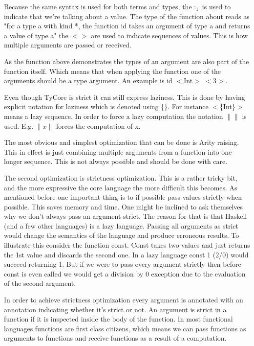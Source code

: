 \documentclass[11pt,twoside,a4paper]{article}
\begin{document}
Because the same syntax is used for both terms and types, the $:_1$ is used to indicate that we're talking about a value. The type of the function about reads as "for a type a with kind *, the function id takes an argument of type a and returns a value of type a" the $<$$>$ are used to indicate sequences of values. This is how multiple arguments are passed or received.

As the function above demonstrates the types of an argument are also part of the function itself. Which means that when applying the function one of the arguments should be a type argument. An example is id $<$Int$>$ $<$3$>$.

Even though TyCore is strict it can still express laziness. This is done by having explicit notation for laziness which is denoted using \{\}. For instance $<$\{Int\}$>$ means a lazy sequence. In order to force a lazy computation the notation $\|\|$ is used. E.g. $\|x\|$ forces the computation of x.

The most obvious and simplest optimization that can be done is Arity raising. This in effect is just combining multiple arguments from a function into one longer sequence. This is not always possible and should be done with care.

The second optimization is strictness optimization. This is a rather tricky bit, and the more expressive the core language the more difficult this becomes. As mentioned before one important thing is to if possible pass values strictly when possible. This saves memory and time. One might be inclined to ask themselves why we don't always pass an argument strict. The reason for that is that Haskell (and a few other languages) is a lazy language. Passing all arguments as strict would change the semantics of the language and produce erroneous results. To illustrate this consider the function const. Const takes two values and just returns the 1st value and discards the second one. In a lazy language const 1 (2/0) would succeed returning 1. But if we were to pass every argument strictly then before const is even called we would get a division by 0 exception due to the evaluation of the second argument.

In order to achieve strictness optimization every argument is annotated with an annotation indicating whether it's strict or not. An argument is strict in a function if it is inspected inside the body of the function.  In most functional languages functions are first class citizens, which means we can pass functions as arguments to functions and receive functions as a result of a computation.
\end{document}
